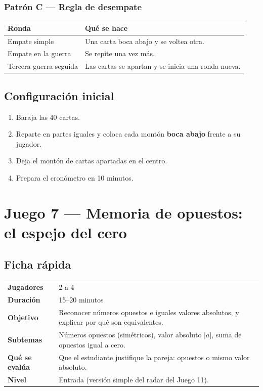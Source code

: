 \documentclass[12pt, letterpaper]{article}
\newcommand{\abs}[1]{\lvert #1\rvert}
\begin{document}
\subsubsection{Patrón C — Regla de desempate}

\begin{center}
\small
\begin{tabular}{@{}p{5.4cm} p{8.6cm}@{}}
\toprule
\textbf{Ronda} & \textbf{Qué se hace}\\
\midrule
Empate simple & Una carta boca abajo y se voltea otra.\\
Empate en la guerra & Se repite una vez más.\\
Tercera guerra seguida & Las cartas se apartan y se inicia una ronda nueva.\\
\bottomrule
\end{tabular}
\end{center}

\subsection{Configuración inicial}

\begin{enumerate}[leftmargin=*]
  \item Baraja las 40 cartas.
  \item Reparte en partes iguales y coloca cada montón \textbf{boca abajo} frente a su jugador.
  \item Deja el montón de cartas apartadas en el centro.
  \item Prepara el cronómetro en 10 minutos.
\end{enumerate}

\clearpage
\section{Juego 7 — Memoria de opuestos: el espejo del cero}

\subsection{Ficha rápida}

\begin{center}
\small
\begin{tabular}{@{}p{3cm} p{12.2cm}@{}}
\toprule
\textbf{Jugadores} & 2 a 4\\
\textbf{Duración} & 15--20 minutos\\
\textbf{Objetivo} & Reconocer números opuestos e iguales valores absolutos, y explicar por qué son equivalentes.\\
\textbf{Subtemas} & Números opuestos (simétricos), valor absoluto $\abs{a}$, suma de opuestos igual a cero.\\
\textbf{Qué se evalúa} & Que el estudiante justifique la pareja: opuestos o mismo valor absoluto.\\
\textbf{Nivel} & Entrada (versión simple del radar del Juego 11).\\
\bottomrule
\end{tabular}
\end{center}
\end{document}
